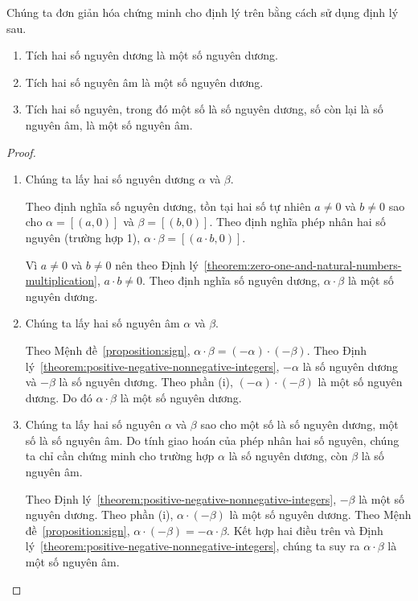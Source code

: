 \noindent Chúng ta đơn giản hóa chứng minh cho định lý trên bằng cách sử dụng định lý sau.

\begin{theorem}\label{theorem:sign-of-product-of-integers}
	\begin{enumerate}[label={(\roman*)}]
		\item Tích hai số nguyên dương là một số nguyên dương.
		\item Tích hai số nguyên âm là một số nguyên dương.
		\item Tích hai số nguyên, trong đó một số là số nguyên dương, số còn lại là số nguyên âm, là một số nguyên âm.
	\end{enumerate}
\end{theorem}

\begin{proof}
	\begin{enumerate}[label={(\roman*)}]
		\item Chúng ta lấy hai số nguyên dương $\alpha$ và $\beta$.

		      Theo định nghĩa số nguyên dương, tồn tại hai số tự nhiên $a\ne 0$ và $b\ne 0$ sao cho $\alpha = [(a,0)]$ và $\beta = [(b,0)]$. Theo định nghĩa phép nhân hai số nguyên (trường hợp 1), $\alpha\cdot\beta = [(a\cdot b, 0)]$.

		      Vì $a\ne 0$ và $b\ne 0$ nên theo Định lý~\ref{theorem:zero-one-and-natural-numbers-multiplication}, $a\cdot b\ne 0$. Theo định nghĩa số nguyên dương, $\alpha\cdot\beta$ là một số nguyên dương.
		\item Chúng ta lấy hai số nguyên âm $\alpha$ và $\beta$.

		      Theo Mệnh đề~\ref{proposition:sign}, $\alpha\cdot\beta = (-\alpha)\cdot(-\beta)$. Theo Định lý~\ref{theorem:positive-negative-nonnegative-integers}, $-\alpha$ là số nguyên dương và $-\beta$ là số nguyên dương. Theo phần (i), $(-\alpha)\cdot(-\beta)$ là một số nguyên dương. Do đó $\alpha\cdot\beta$ là một số nguyên dương.
		\item Chúng ta lấy hai số nguyên $\alpha$ và $\beta$ sao cho một số là số nguyên dương, một số là số nguyên âm. Do tính giao hoán của phép nhân hai số nguyên, chúng ta chỉ cần chứng minh cho trường hợp $\alpha$ là số nguyên dương, còn $\beta$ là số nguyên âm.

		      Theo Định lý~\ref{theorem:positive-negative-nonnegative-integers}, $-\beta$ là một số nguyên dương. Theo phần (i), $\alpha\cdot(-\beta)$ là một số nguyên dương. Theo Mệnh đề~\ref{proposition:sign}, $\alpha\cdot(-\beta) = -\alpha\cdot\beta$. Kết hợp hai điều trên và Định lý~\ref{theorem:positive-negative-nonnegative-integers}, chúng ta suy ra $\alpha\cdot\beta$ là một số nguyên âm.
	\end{enumerate}
\end{proof}

